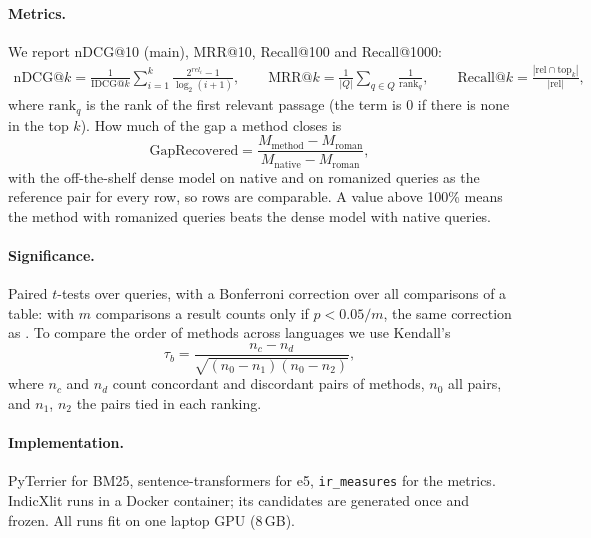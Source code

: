 \documentclass[11pt,a4paper]{article}
\newcommand{\gr}{\mathrm{GapRecovered}}
\begin{document}
\paragraph{Metrics.} We report nDCG@10 (main), MRR@10, Recall@100 and Recall@1000:
\begin{gather}
  \mathrm{nDCG@}k = \frac{1}{\mathrm{IDCG@}k}\sum_{i=1}^{k} \frac{2^{rel_i}-1}{\log_2(i+1)},
  \qquad
  \mathrm{MRR@}k = \frac{1}{|Q|}\sum_{q \in Q} \frac{1}{\mathrm{rank}_q},
  \qquad
  \mathrm{Recall@}k = \frac{|\mathrm{rel} \cap \mathrm{top}_k|}{|\mathrm{rel}|},
\end{gather}
where $\mathrm{rank}_q$ is the rank of the first relevant passage (the term is 0 if there is
none in the top $k$). How much of the gap a method closes is
\begin{equation}
  \gr = \frac{M_{\mathrm{method}} - M_{\mathrm{roman}}}{M_{\mathrm{native}} - M_{\mathrm{roman}}},
\end{equation}
with the off-the-shelf dense model on native and on romanized queries as the reference pair
for every row, so rows are comparable. A value above 100\% means the method with romanized
queries beats the dense model with native queries.

\paragraph{Significance.} Paired $t$-tests over queries, with a Bonferroni correction over
all comparisons of a table: with $m$ comparisons a result counts only if $p < 0.05/m$, the
same correction as \citet{chari2025lost}. To compare the order of methods across languages
we use Kendall's
\begin{equation}
  \tau_b = \frac{n_c - n_d}{\sqrt{(n_0 - n_1)(n_0 - n_2)}},
\end{equation}
where $n_c$ and $n_d$ count concordant and discordant pairs of methods, $n_0$ all pairs,
and $n_1$, $n_2$ the pairs tied in each ranking.

\paragraph{Implementation.} PyTerrier \citep{macdonald2020pyterrier} for BM25,
sentence-transformers for e5, \texttt{ir\_measures} \citep{macavaney2022irmeasures} for the
metrics. IndicXlit runs in a Docker container; its candidates are generated once and frozen.
All runs fit on one laptop GPU (8\,GB).

\end{document}
